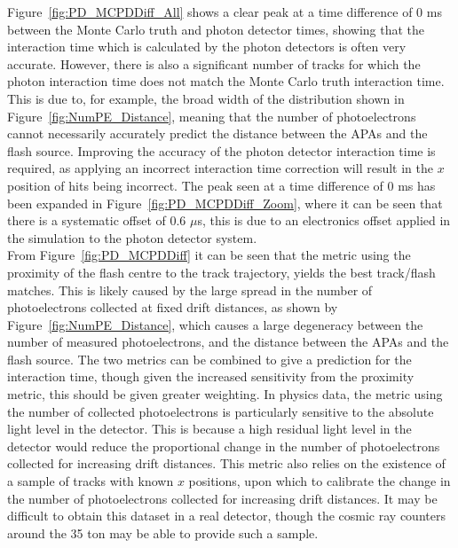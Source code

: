 Figure~\ref{fig:PD_MCPDDiff_All} shows a clear peak at a time difference of 0 ms between the Monte Carlo truth and photon detector times, showing that the interaction time which is calculated by the photon detectors is often very accurate. However, there is also a significant number of tracks for which the photon interaction time does not match the Monte Carlo truth interaction time. This is due to, for example, the broad width of the distribution shown in Figure~\ref{fig:NumPE_Distance}, meaning that the number of photoelectrons cannot necessarily accurately predict the distance between the APAs and the flash source. Improving the accuracy of the photon detector interaction time is required, as applying an incorrect interaction time correction will result in the $x$ position of hits being incorrect. The peak seen at a time difference of 0 ms has been expanded in Figure~\ref{fig:PD_MCPDDiff_Zoom}, where it can be seen that there is a systematic offset of 0.6 $\mu$s, this is due to an electronics offset applied in the simulation to the photon detector system. \\

From Figure~\ref{fig:PD_MCPDDiff} it can be seen that the metric using the proximity of the flash centre to the track trajectory, yields the best track/flash matches. This is likely caused by the large spread in the number of photoelectrons collected at fixed drift distances, as shown by Figure~\ref{fig:NumPE_Distance}, which causes a large degeneracy between the number of measured photoelectrons, and the distance between the APAs and the flash source. The two metrics can be combined to give a prediction for the interaction time, though given the increased sensitivity from the proximity metric, this should be given greater weighting. In physics data, the metric using the number of collected photoelectrons is particularly sensitive to the absolute light level in the detector. This is because a high residual light level in the detector would reduce the proportional change in the number of photoelectrons collected for increasing drift distances. This metric also relies on the existence of a sample of tracks with known $x$ positions, upon which to calibrate the change in the number of photoelectrons collected for increasing drift distances. It may be difficult to obtain this dataset in a real detector, though the cosmic ray counters around the 35 ton may be able to provide such a sample. \\

